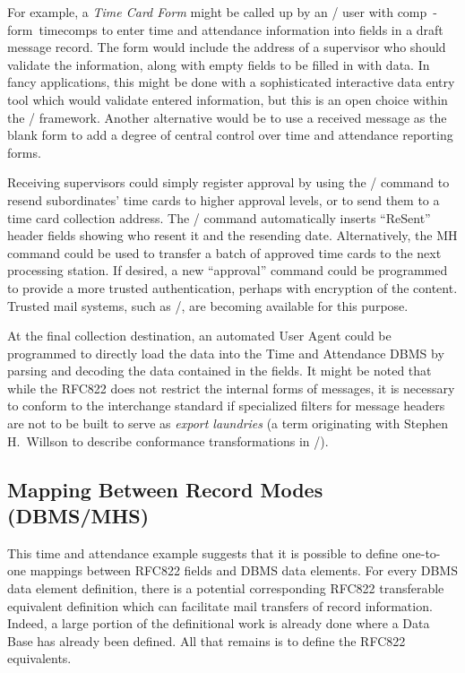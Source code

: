 For example,
a {\it Time Card Form} might be called up by an \MH/ user with
\example comp\ -form\ timecomps\endexample
to enter time and attendance information into  fields in a
draft message record.
The  form would include the address of a
supervisor who should validate the information,
along with empty fields to be filled in with data.
In fancy applications,
this might be done with a sophisticated interactive data entry tool
which would validate entered information,
but this is an open choice within the \MH/ framework.
Another
alternative would be to use a received message as the blank form to add a
degree of central control over time and attendance reporting forms.

Receiving supervisors could simply register approval by using the \MH/
 command to resend subordinates' time cards to higher approval
levels, or
to send them to a time card collection address.
The \MH/  command automatically inserts ``ReSent'' header fields
showing who resent it and the resending date.
Alternatively,
the MH  command could be used to transfer a batch of approved time
cards to the next processing station.
If desired, a new ``approval'' command could be programmed to provide a more
trusted authentication, perhaps with encryption of the content.
Trusted mail systems, such as \trustedmail/\cite{MRose85c},
are becoming available for this purpose.

At the final collection destination,
an automated User Agent could be programmed to directly load the data into
the Time and Attendance DBMS by
parsing and decoding the data contained in the  fields.
It might be noted that while the RFC822 does not restrict the
internal forms of messages,
it is necessary to conform to the interchange standard if specialized filters
for message headers are not to be built to serve as {\it export laundries}
(a term originating with Stephen H.~Willson to describe conformance
transformations in \Ada/).

\subsection{Mapping Between Record Modes (DBMS/MHS)}
This time and attendance example suggests that it is possible to define
one-to-one mappings between RFC822 fields and DBMS data elements.
For every DBMS data element definition,
there is a potential corresponding RFC822 transferable equivalent
definition which can facilitate mail transfers of record information.
Indeed,
a large portion of the definitional work is already done where a Data Base
has already been defined.
All that remains is to define the RFC822 equivalents.

